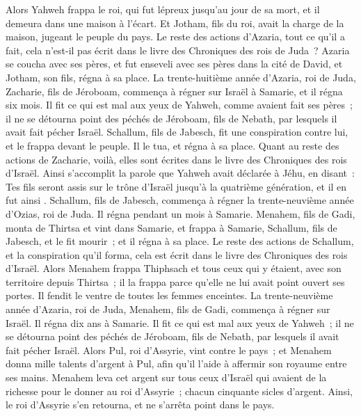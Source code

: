 \begin{multicols}{2}
Alors Yahweh frappa le roi, qui fut lépreux jusqu'au jour de sa mort, et il demeura dans une maison à l'écart. Et Jotham, fils du roi, avait la charge de la maison, jugeant le peuple du pays.
Le reste des actions d'Azaria, tout ce qu'il a fait, cela n'est-il pas écrit dans le livre des Chroniques des rois de Juda~?
Azaria se coucha avec ses pères, et fut enseveli avec ses pères dans la cité de David, et Jotham, son fils, régna à sa place.
La trente-huitième année d'Azaria, roi de Juda, Zacharie, fils de Jéroboam, commença à régner sur Israël à Samarie, et il régna six mois.
Il fit ce qui est mal aux yeux de Yahweh, comme avaient fait ses pères~; il ne se détourna point des péchés de Jéroboam, fils de Nebath, par lesquels il avait fait pécher Israël.
Schallum, fils de Jabesch, fit une conspiration contre lui, et le frappa devant le peuple. Il le tua, et régna à sa place.
Quant au reste des actions de Zacharie, voilà, elles sont écrites dans le livre des Chroniques des rois d'Israël.
Ainsi s'accomplit la parole que Yahweh avait déclarée à Jéhu, en disant~: Tes fils seront assis sur le trône d'Israël jusqu'à la quatrième génération, et il en fut ainsi
.
Schallum, fils de Jabesch, commença à régner la trente-neuvième année d'Ozias, roi de Juda. Il régna pendant un mois à Samarie.
Menahem, fils de Gadi, monta de Thirtsa et vint dans Samarie, et frappa à Samarie, Schallum, fils de Jabesch, et le fit mourir~; et il régna à sa place.
Le reste des actions de Schallum, et la conspiration qu'il forma, cela est écrit dans le livre des Chroniques des rois d'Israël.
Alors Menahem frappa Thiphsach et tous ceux qui y étaient, avec son territoire depuis Thirtsa~; il la frappa parce qu'elle ne lui avait point ouvert ses portes. Il fendit le ventre de toutes les femmes enceintes.
La trente-neuvième année d'Azaria, roi de Juda, Menahem, fils de Gadi, commença à régner sur Israël. Il régna dix ans à Samarie.
Il fit ce qui est mal aux yeux de Yahweh~; il ne se détourna point des péchés de Jéroboam, fils de Nebath, par lesquels il avait fait pécher Israël.
Alors Pul, roi d'Assyrie, vint contre le pays~; et Menahem donna mille talents d'argent à Pul, afin qu'il l'aide à affermir son royaume entre ses mains.
Menahem leva cet argent sur tous ceux d'Israël qui avaient de la richesse pour le donner au roi d'Assyrie~; chacun cinquante sicles d'argent. Ainsi, le roi d'Assyrie s'en retourna, et ne s'arrêta point dans le pays.

\end{multicols}
